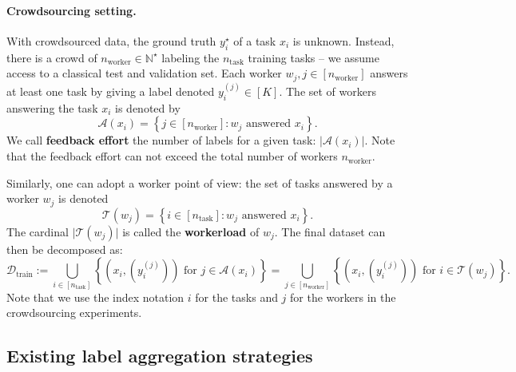 \paragraph*{Crowdsourcing setting.}
With crowdsourced data, the ground truth $y_i^\star$ of a task $x_i$ is unknown.
Instead, there is a crowd of $n_{\text{worker}}\in \mathbb{N}^\star$ labeling the $n_\text{task}$ training tasks -- we assume access to a classical test and validation set.
Each worker $w_j,j\in [n_{\text{worker}}]$ answers at least one task by giving a label denoted $y_i^{(j)}\in[K]$.
The set of workers answering the task $x_i$ is denoted by
\begin{equation}\label{eq:feedback}
\mathcal{A}(x_i)=\left\{j\in[n_\text{worker}]: w_j \text{ answered }x_i\right\}.
\end{equation}
We call \textbf{feedback effort} the number of labels for a given task: $|\mathcal{A}(x_i)|$.
Note that the feedback effort can not exceed the total number of workers $n_{\text{worker}}$.

Similarly, one can adopt a worker point of view: the set of tasks answered by a worker $w_j$ is denoted
\begin{equation}\label{eq:workerload}
\mathcal{T}(w_j)=\left\{i\in[n_\text{task}]: w_j \text{ answered } x_i\right\}.
\end{equation}
The cardinal $\vert \mathcal{T}(w_j)\vert$ is called the \textbf{workerload} of $w_j$.
The final dataset can then be decomposed as:
\begin{equation}\label{eq:trainset}
\mathcal{D}_{\text{train}} := \bigcup_{i\in[n_\text{task}]} \left\{(x_i, (y_i^{(j)})) \text{ for }j\in\mathcal{A}(x_i)\right\} = \bigcup_{j\in[n_\text{worker}]} \left\{(x_i, (y_i^{(j)})) \text{ for }i \in\mathcal{T}(w_j)\right\} .
\end{equation}
Note that we use the index notation $i$ for the tasks and $j$ for the workers in the crowdsourcing experiments.

\subsection{Existing label aggregation strategies}
\label{sub:aggregating_votes}

